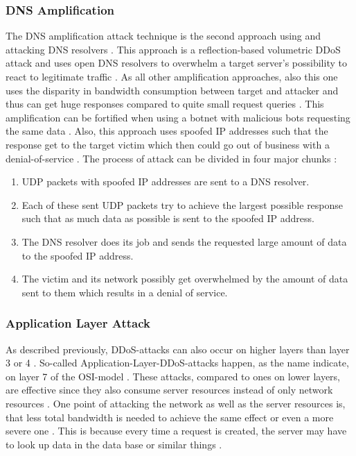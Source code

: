 \subsubsection*{DNS Amplification}
The DNS amplification attack technique is the second approach using and attacking DNS resolvers \cite{Cloudflare-DNSFlood, Cloudflare-DNSAmplification}. This approach is a reflection-based volumetric DDoS attack and uses open DNS resolvers to overwhelm a target server's possibility to react to legitimate traffic \cite{Cloudflare-DNSAmplification}. As all other amplification approaches, also this one uses the disparity in bandwidth consumption between target and attacker and thus can get huge responses compared to quite small request queries \cite{Cloudflare-DNSAmplification}. This amplification can be fortified when using a botnet with malicious bots requesting the same data \cite{Cloudflare-DNSAmplification}.
Also, this approach uses spoofed IP addresses such that the response get to the target victim which then could go out of business with a denial-of-service \cite{Cloudflare-DNSAmplification}. The process of attack can be divided in four major chunks \cite{Cloudflare-DNSAmplification}:
\begin{enumerate}
    \item UDP packets with spoofed IP addresses are sent to a DNS resolver. 
    \item Each of these sent UDP packets try to achieve the largest possible response such that as much data as possible is sent to the spoofed IP address.
    \item The DNS resolver does its job and sends the requested large amount of data to the spoofed IP address. 
    \item The victim and its network possibly get overwhelmed by the amount of data sent to them which results in a denial of service. 
\end{enumerate}

\subsubsection*{Application Layer Attack}
As described previously, DDoS-attacks can also occur on higher layers than layer 3 or 4 \cite{Cloudflare-ApplicationLayer}. So-called Application-Layer-DDoS-attacks happen, as the name indicate, on layer 7 of the OSI-model \cite{Cloudflare-ApplicationLayer}. These attacks, compared to ones on lower layers, are effective since they also consume server resources instead of only network resources \cite{Cloudflare-ApplicationLayer}. One point of attacking the network as well as the server resources is, that less total bandwidth is needed to achieve the same effect or even a more severe one \cite{Cloudflare-ApplicationLayer}. This is because every time a request is created, the server may have to look up data in the data base or similar things \cite{Cloudflare-ApplicationLayer}. 


